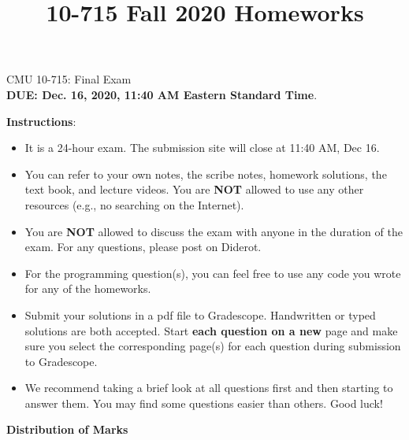 \documentclass[letterpaper,12pt,addpoints]{exam}
\title{10-715 Fall 2020 Homeworks}
\begin{document}
\begin{center}
{\Large CMU 10-715: Final Exam}\\
{\bf DUE: Dec. 16, 2020, 11:40 AM Eastern Standard Time}.\\
\end{center}

\textbf{\large Instructions}:

\begin{itemize}
    \item It is a 24-hour exam. The submission site will close at 11:40 AM, Dec 16.

    \item You can refer to your own notes, the scribe notes, homework solutions, the text book, and lecture videos. You are \textbf{NOT} allowed to use any other resources (e.g., no searching on the Internet).
    
    \item You are \textbf{NOT} allowed to discuss the exam with anyone in the duration of the exam. For any questions, please post on Diderot.
    
    \item For the programming question(s), you can feel free to use any code you wrote for any of the homeworks. 
    
    \item Submit your solutions in a pdf file to Gradescope. Handwritten or typed solutions are both accepted. Start \textbf{each question on a new} page and make sure you select the corresponding page(s) for each question during submission to Gradescope. 
    
    \item We recommend taking a brief look at all questions first and then starting to answer them. You may find some questions easier than others. Good luck!
\end{itemize}

\begin{center}
\textbf{Distribution of Marks}\\
\medskip
\gradetable[v][questions]
\end{center}
\end{document}
